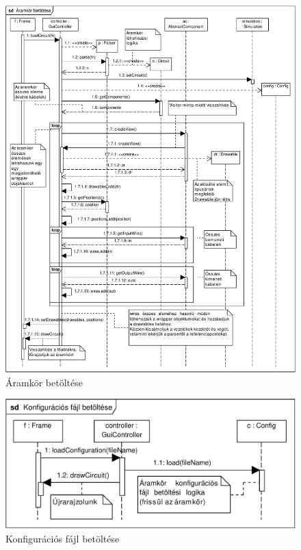 \begin{figure}[H]
\begin{center}
\includegraphics[width=17cm]{chapters/chapter11/pdfs/2_loadcircuit.pdf}
\caption{Áramkör betöltése}
\label{fig:loadcircuit}
\end{center}
\end{figure}

\begin{figure}[H]
\begin{center}
\includegraphics[width=17cm]{chapters/chapter11/pdfs/3_loadconfig.pdf}
\caption{Konfigurációs fájl betöltése}
\label{fig:loadconfig}
\end{center}
\end{figure}


